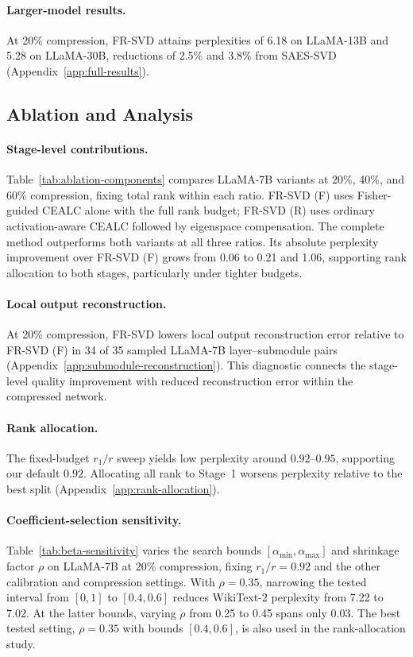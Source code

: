 \documentclass[11pt]{article}
\begin{document}
\paragraph{Larger-model results.}
At 20\% compression, FR-SVD attains perplexities of 6.18 on LLaMA-13B and 5.28 on LLaMA-30B, reductions of 2.5\% and 3.8\% from SAES-SVD (Appendix~\ref{app:full-results}).

\subsection{Ablation and Analysis}\label{sec:ablation}

\paragraph{Stage-level contributions.}

Table~\ref{tab:ablation-components} compares LLaMA-7B variants at 20\%, 40\%, and 60\% compression, fixing total rank within each ratio. FR-SVD (F) uses Fisher-guided CEALC alone with the full rank budget; FR-SVD (R) uses ordinary activation-aware CEALC followed by eigenspace compensation. The complete method outperforms both variants at all three ratios. Its absolute perplexity improvement over FR-SVD (F) grows from 0.06 to 0.21 and 1.06, supporting rank allocation to both stages, particularly under tighter budgets.



\paragraph{Local output reconstruction.}
At 20\% compression, FR-SVD lowers local output reconstruction error relative to FR-SVD (F) in 34 of 35 sampled LLaMA-7B layer--submodule pairs (Appendix~\ref{app:submodule-reconstruction}). This diagnostic connects the stage-level quality improvement with reduced reconstruction error within the compressed network.

\paragraph{Rank allocation.}
The fixed-budget $r_1/r$ sweep yields low perplexity around $0.92$--$0.95$, supporting our default $0.92$. Allocating all rank to Stage~1 worsens perplexity relative to the best split (Appendix~\ref{app:rank-allocation}).

\paragraph{Coefficient-selection sensitivity.}
Table~\ref{tab:beta-sensitivity} varies the search bounds $[\alpha_{\min},\alpha_{\max}]$ and shrinkage factor $\rho$ on LLaMA-7B at $20\%$ compression, fixing $r_1/r=0.92$ and the other calibration and compression settings. With $\rho=0.35$, narrowing the tested interval from $[0,1]$ to $[0.4,0.6]$ reduces WikiText-2 perplexity from 7.22 to 7.02. At the latter bounds, varying $\rho$ from 0.25 to 0.45 spans only 0.03. The best tested setting, $\rho=0.35$ with bounds $[0.4,0.6]$, is also used in the rank-allocation study.
\end{document}
